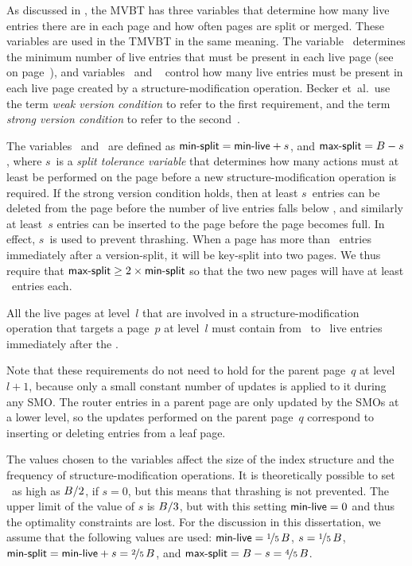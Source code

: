 As discussed in , the MVBT has three variables that
determine how many live entries there are in each page and how often pages
are split or merged.
These variables are used in the TMVBT in the same meaning.
The variable \minlive\ determines the minimum number of live entries that
must be present in each live page (see  on
page~\pageref{inv:mvbt-live-count}), and variables \minsplit\ and \maxsplit\
control how many live entries must be present in each live page created by a
structure-modification operation. 
Becker et~al.\ use the term \emph{weak version condition} to refer to the
first requirement, and the term \emph{strong version
condition}\label{def:strong-version} to refer to the
second~\cite{becker:1993:optimal,becker:1996:mvbt}.

The variables \minsplit\ and \maxsplit\ are defined as 
$\text{\textsf{min-split}} = \text{\textsf{min-live}} + s$, and $\text{\textsf{max-split}} = B - s$, where $s$~is
a \emph{split tolerance variable} that determines how many actions must at
least be performed on the page before a new structure-modification operation
is required.
If the strong version condition holds, then at least $s$~entries can be
deleted from the page before the number of live entries falls below \minlive,
and similarly at least~$s$ entries can be inserted to the page before the page
becomes full.
In effect, $s$~is used to prevent thrashing.
When a page has more than \maxsplit\ entries immediately after a
version-split, it will be key-split into two pages. 
We thus require that $\text{\textsf{max-split}} \geq 2 \times \text{\textsf{min-split}}$ so that the two new
pages will have at least \minsplit\ entries each.

\thmskip
\begin{invariant}
\label{inv:tmvbt-minsplit-maxsplit}
All the live pages at level~$l$ that are involved in a structure-modification
operation that targets a page~$p$ at level~$l$ must contain
from \minsplit\ to \maxsplit\ live entries immediately after the \@.
\end{invariant}
\thmskip

Note that these requirements do not need to hold for the parent page~$q$ at
level $l+1$, because only a small constant number of updates is applied to it
during any SMO\@.
The router entries in a parent page are only updated by the SMOs at a lower
level, so the updates performed on the parent page~$q$ correspond to inserting
or deleting entries from a leaf page.

The values chosen to the variables affect the size of the index structure and
the frequency of structure-modification operations. 
It is theoretically possible to set \minlive\ as high as $B/2$, if $s
= 0$, but this means that thrashing is not prevented.
The upper limit of the value of $s$ is $B/3$, but with this setting
$\text{\textsf{min-live}} = 0$ and thus the optimality constraints are lost.
For the discussion in this dissertation, we assume that the following values
are used: $\text{\textsf{min-live}} = \nicefrac{1}{5}\, B$, $s = \nicefrac{1}{5}\,
B$, $\text{\textsf{min-split}} = \text{\textsf{min-live}} + s = \nicefrac{2}{5}\, B$, and
$\text{\textsf{max-split}} = B - s = \nicefrac{4}{5}\, B$.

